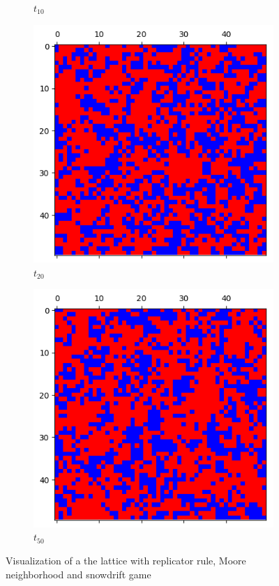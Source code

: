 \documentclass[letterpaper]{article}
\begin{document}
\begin{figure}
\begin{subfigure}{.33\textwidth}
      \caption{$t_{10}$}
      \label{fig:t10_50part2}
    \end{subfigure}
    \begin{subfigure}{.33\textwidth}
      \centering
      \includegraphics[width=1\linewidth]{images/assign2/visu_50-part2/t20}
      \caption{$t_{20}$}
      \label{fig:t20_50part2}
    \end{subfigure}
    \begin{subfigure}{.33\textwidth}
      \centering
      \includegraphics[width=1\linewidth]{images/assign2/visu_50-part2/t50}
      \caption{$t_{50}$}
      \label{fig:t50_50part2}
    \end{subfigure}
    \caption{Visualization of a the lattice with replicator rule,
    Moore neighborhood and snowdrift game}
    \label{fig:visu50part2}
\end{figure}
\end{document}
